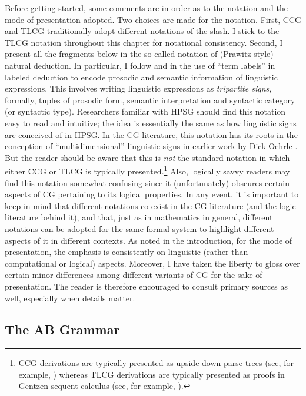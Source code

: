 \documentclass[output=paper
                ,modfonts
 	        ,biblatex
                ,babelshorthands
                ,newtxmath
                ,draftmode
                ,colorlinks, citecolor=brown
]{langscibook}
\begin{document}
Before getting started, some comments are in order as to the notation
and the mode of presentation adopted. Two choices are made for the
notation. First, CCG and TLCG traditionally adopt different notations
of the slash. I stick to the TLCG notation throughout this chapter for
notational consistency. Second, I present all the fragments below in
the so-called  notation of (Prawitz-style)
natural deduction. In particular, I follow \citet{oehrle1994} and
\citet{Morrill94a-u} in the use of ``term labels'' in labeled deduction
to encode prosodic and semantic information of linguistic expressions.
This involves writing linguistic expressions as \emph{tripartite
signs}, formally, tuples of prosodic form, semantic interpretation and
syntactic category (or syntactic type). Researchers familiar with HPSG
should find this notation easy to read and intuitive; the idea is
essentially the same as how linguistic signs are conceived of in HPSG.
In the CG literature, this notation has its roots in the conception of
``multidimensional'' linguistic signs in earlier work by Dick Oehrle
\citeyearpar{oehrle88}. But the reader should be aware that this is
\emph{not} the standard notation in which either CCG or TLCG is
typically presented.\footnote{CCG derivations are typically presented
  as upside-down parse trees (see, for example,
  \citealt{Steedman2000a-u,steedman2012}) whereas  TLCG derivations are
  typically presented as proofs in Gentzen sequent calculus (see, for
  example, \citealt{Moortgat2011a-u,barkershan2015}).}
Also, logically savvy readers may find this
notation somewhat confusing since it (unfortunately) obscures certain
aspects of CG pertaining to its logical properties. In any event, it
is important to keep in mind that different notations co-exist in the
CG literature (and the logic literature behind it), and that, just as
in mathematics in general, different notations can be adopted for the
same formal system to highlight different aspects of it in different
contexts. As noted in the introduction,  for the mode of presentation, the emphasis is consistently
on linguistic (rather than computational or logical) aspects.
Moreover, I have taken the liberty to gloss over certain
minor differences among different variants of CG for the sake of
presentation. The reader is therefore encouraged
to consult primary sources as well, especially when details matter.


\subsection{The AB Grammar \label{ab}}
\end{document}
